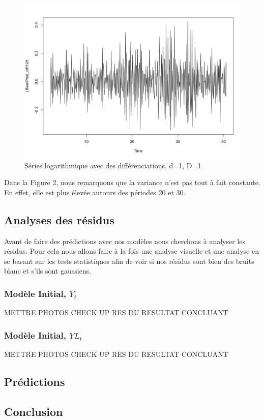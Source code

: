 \documentclass[12pt,a4paper]{book}
\newcommand{\1}{\mathds{1}}
\begin{document}
\begin{figure}[h]
 \centering
  \includegraphics[scale=0.3]{Log_Avecd1D1}  
\caption{Séries logarithmique avec des différenciations, d=1, D=1 }
\label{fig:1}
\end{figure}

Dans la Figure 2, nous remarquons que la variance n'est pas tout à fait constante. En effet, elle est plus élevée autours des périodes 20 et 30. 

\vspace{5 mm}
\subsection{Analyses des résidus}
Avant de faire des prédictions avec nos modèles nous cherchons à analyser les résidus. Pour cela nous allons faire à la fois une analyse visuelle et une analyse en se basant sur les tests statistiques afin de voir si nos résidus sont bien des bruits blanc et s'ils sont gaussiens.

\subsubsection{Modèle Initial, $Y_t$}

METTRE PHOTOS CHECK UP RES DU RESULTAT CONCLUANT

\subsubsection{Modèle Initial, $YL_t$}

METTRE PHOTOS CHECK UP RES DU RESULTAT CONCLUANT

\vspace{5 mm}
\subsection{Prédictions}





\vspace{5 mm}
\subsection{Conclusion}
\end{document}
